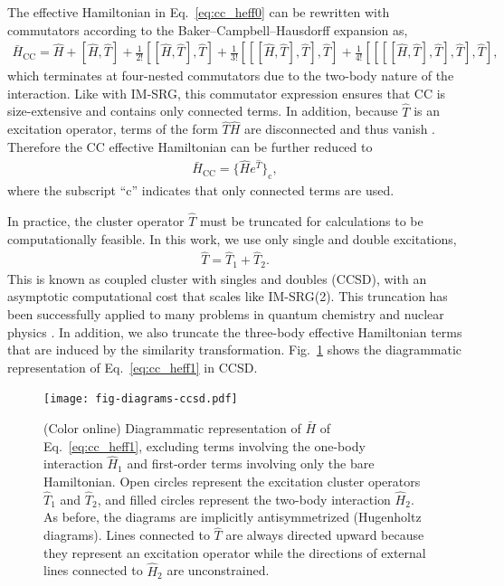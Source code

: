 \documentclass[aip, jcp, 12pt]{revtex4-1}
\begin{document}
The effective Hamiltonian in Eq.\ \eqref{eq:cc_heff0} can be rewritten with commutators according to the Baker--Campbell--Hausdorff expansion as,
\begin{align*}
  \bar{H}_{\mathrm{CC}} = \hat{H} + [\hat{H}, \hat{T}] + \frac{1}{2!} [[\hat{H}, \hat{T} ], \hat{T}] + \frac{1}{3!} [[[\hat{H}, \hat{T}], \hat{T}], \hat{T}] + \frac{1}{4!} [[[[\hat{H}, \hat{T}], \hat{T}], \hat{T}], \hat{T}],
\end{align*}
which terminates at four-nested commutators due to the two-body nature of the interaction.  Like with IM-SRG, this commutator expression ensures that CC is size-extensive and contains only connected terms.  In addition, because $\hat{T}$ is an excitation operator, terms of the form $\hat{T} \hat{H}$ are disconnected and thus vanish \cite{shavitt2009many}.  Therefore the CC effective Hamiltonian can be further reduced to
\begin{align} \label{eq:cc_heff1}
  \bar{H}_{\mathrm{CC}} = \bigl\{\hat{H}e^{\hat{T}}\bigr\}_{\mathrm{c}},
\end{align}
where the subscript ``$\mathrm{c}$'' indicates that only connected terms are used.

In practice, the cluster operator $\hat{T}$ must be truncated for calculations to be computationally feasible.  In this work, we use only single and double excitations,
\begin{align*}
  \hat{T} = \hat{T}_1 + \hat{T}_2.
\end{align*}
This is known as coupled cluster with singles and doubles (CCSD), with an asymptotic computational cost that scales like IM-SRG(2).  This truncation has been successfully applied to many problems in quantum chemistry \cite{RevModPhys.79.291} and nuclear physics \cite{2014RPPh...77i6302H}.  In addition, we also truncate the three-body effective Hamiltonian terms that are induced by the similarity transformation.  Fig.\ \ref{fig:diagrams-ccsd} shows the diagrammatic representation of Eq.\ \eqref{eq:cc_heff1} in CCSD.

\begin{figure}
  \texttt{[image: fig-diagrams-ccsd.pdf]}
  \caption{(Color online) Diagrammatic representation of $\bar{H}$ of Eq.\ \eqref{eq:cc_heff1}, excluding terms involving the one-body interaction $\hat{H}_1$ and first-order terms involving only the bare Hamiltonian. Open circles represent the excitation cluster operators $\hat{T}_1$ and $\hat{T}_2$, and filled circles represent the two-body interaction $\hat{H}_2$.  As before, the diagrams are implicitly antisymmetrized (Hugenholtz diagrams).  Lines connected to $\hat{T}$ are always directed upward because they represent an excitation operator while the directions of external lines connected to $\hat{H}_2$ are unconstrained. }
  \label{fig:diagrams-ccsd}
\end{figure}
\end{document}
